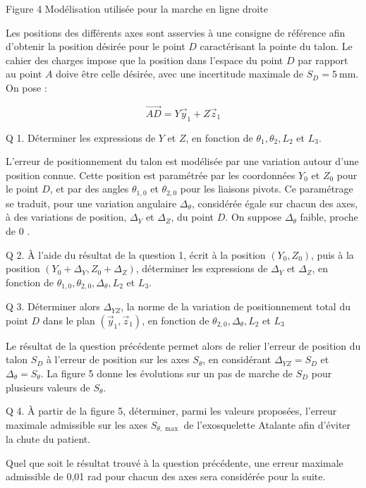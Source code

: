 \documentclass[10pt]{article}
\begin{document}
Figure 4 Modélisation utilisée pour la marche en ligne droite

Les positions des différents axes sont asservies à une consigne de référence afin d'obtenir la position désirée pour le point $D$ caractérisant la pointe du talon. Le cahier des charges impose que la position dans l'espace du point $D$ par rapport au point $A$ doive être celle désirée, avec une incertitude maximale de $S_{D}=5 \mathrm{~mm}$. On pose :

$$
\overrightarrow{A D}=Y \vec{y}_{1}+Z \vec{z}_{1}
$$

Q 1. Déterminer les expressions de $Y$ et $Z$, en fonction de $\theta_{1}, \theta_{2}, L_{2}$ et $L_{3}$.

L'erreur de positionnement du talon est modélisée par une variation autour d'une position connue. Cette position est paramétrée par les coordonnées $Y_{0}$ et $Z_{0}$ pour le point $D$, et par des angles $\theta_{1,0}$ et $\theta_{2,0}$ pour les liaisons pivots. Ce paramétrage se traduit, pour une variation angulaire $\Delta_{\theta}$, considérée égale sur chacun des axes, à des variations de position, $\Delta_{Y}$ et $\Delta_{Z}$, du point $D$. On suppose $\Delta_{\theta}$ faible, proche de 0 .

Q 2. À l'aide du résultat de la question 1, écrit à la position $\left(Y_{0}, Z_{0}\right)$, puis à la position $\left(Y_{0}+\Delta_{Y}, Z_{0}+\Delta_{Z}\right)$, déterminer les expressions de $\Delta_{Y}$ et $\Delta_{Z}$, en fonction de $\theta_{1,0}, \theta_{2,0}, \Delta_{\theta}, L_{2}$ et $L_{3}$.

Q 3. Déterminer alors $\Delta_{Y Z}$, la norme de la variation de positionnement total du point $D$ dans le plan $\left(\vec{y}_{1}, \vec{z}_{1}\right)$, en fonction de $\theta_{2,0}, \Delta_{\theta}, L_{2}$ et $L_{3}$

Le résultat de la question précédente permet alors de relier l'erreur de position du talon $S_{D}$ à l'erreur de position sur les axes $S_{\theta}$, en considérant $\Delta_{Y Z}=S_{D}$ et $\Delta_{\theta}=S_{\theta}$. La figure 5 donne les évolutions sur un pas de marche de $S_{D}$ pour plusieurs valeurs de $S_{\theta}$.

Q 4. À partir de la figure 5, déterminer, parmi les valeurs proposées, l'erreur maximale admissible sur les axes $S_{\theta, \max }$ de l'exosquelette Atalante afin d'éviter la chute du patient.

Quel que soit le résultat trouvé à la question précédente, une erreur maximale admissible de 0,01 rad pour chacun des axes sera considérée pour la suite.
\end{document}
